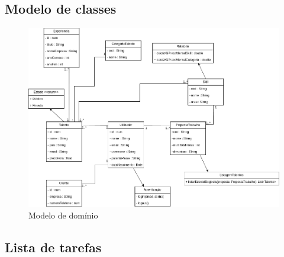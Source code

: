 \newpage

\subsection{Modelo de classes}

\begin{figure}[h]
    \centering
    \includegraphics[width=1\linewidth]{imagens/ModeloDominio_v2.png}
    \caption{Modelo de domínio}
    \label{fig:2}
\end{figure}

\newpage

\subsection{Lista de tarefas}

